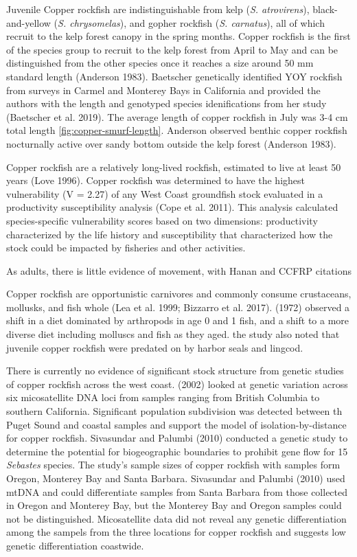 \documentclass[11pt,
  english,
  letterpaper,
]{article}
\begin{document}
Juvenile Copper rockfish are indistinguishable from kelp (\emph{S. atrovirens}), black-and-yellow (\emph{S. chrysomelas}), and gopher rockfish (\emph{S. carnatus}), all of which recruit to the kelp forest canopy in the spring months. Copper rockfish is the first of the species group to recruit to the kelp forest from April to May and can be distinguished from the other species once it reaches a size around 50 mm standard length (Anderson 1983). Baetscher genetically identified YOY rockfish from surveys in Carmel and Monterey Bays in California and provided the authors with the length and genotyped species idenifications from her study (Baetscher et al. 2019). The average length of copper rockfish in July was 3-4 cm total length \ref{fig:copper-smurf-length}. Anderson observed benthic copper rockfish nocturnally active over sandy bottom outside the kelp forest (Anderson 1983).

Copper rockfish are a relatively long-lived rockfish, estimated to live at least 50 years (Love 1996). Copper rockfish was determined to have the highest vulnerability (V = 2.27) of any West Coast groundfish stock evaluated in a productivity susceptibility analysis (Cope et al. 2011). This analysis calculated species-specific vulnerability scores based on two dimensions: productivity characterized by the life history and susceptibility that characterized how the stock could be impacted by fisheries and other activities.

As adults, there is little evidence of movement, with Hanan and CCFRP citations

Copper rockfish are opportunistic carnivores and commonly consume crustaceans, mollusks, and fish whole (Lea et al. 1999; Bizzarro et al. 2017). (1972) observed a shift in a diet dominated by arthropods in age 0 and 1 fish, and a shift to a more diverse diet including molluscs and fish as they aged. the study also noted that juvenile copper rockfish were predated on by harbor seals and lingcod.

There is currently no evidence of significant stock structure from genetic studies of copper rockfish across the west coast. (2002) looked at genetic variation across six micosatellite DNA loci from samples ranging from British Columbia to southern California. Significant population subdivision was detected between th Puget Sound and coastal samples and support the model of isolation-by-distance for copper rockfish. Sivasundar and Palumbi (2010) conducted a genetic study to determine the potential for biogeographic boundaries to prohibit gene flow for 15 \emph{Sebastes} species. The study's sample sizes of copper rockfish with samples form Oregon, Monterey Bay and Santa Barbara. Sivasundar and Palumbi (2010) used mtDNA and could differentiate samples from Santa Barbara from those collected in Oregon and Monterey Bay, but the Monterey Bay and Oregon samples could not be distinguished. Micosatellite data did not reveal any genetic differentiation among the sampels from the three locations for copper rockfish and suggests low genetic differentiation coastwide.
\end{document}
